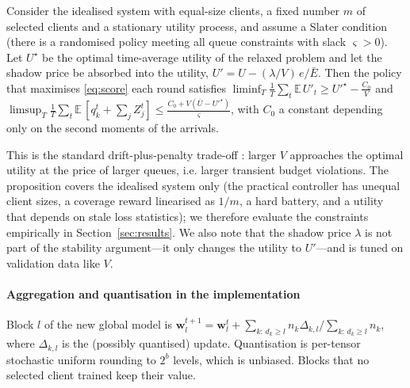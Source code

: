 \begin{proposition}\label{prop:lyap}
Consider the idealised system with equal-size clients, a fixed number $m$ of selected clients and a stationary utility process, and assume a Slater condition (there is a randomised policy meeting all queue constraints with slack $\varsigma>0$). Let $U^\star$ be the optimal time-average utility of the relaxed problem and let the shadow price be absorbed into the utility, $U'=U-(\lambda/V)\,e/\bar E$. Then the policy that maximises \eqref{eq:score} each round satisfies
$\liminf_T\frac1T\sum_t\mathbb E\,U'_t\ge U'^{\star}-\frac{C_0}{V}$ and
$\limsup_T\frac1T\sum_t\mathbb E\,[q_k^t+\sum_jZ_j^t]\le\frac{C_0+V(\bar U-U'^\star)}{\varsigma}$, with $C_0$ a constant depending only on the second moments of the arrivals.
\end{proposition}
\noindent This is the standard drift-plus-penalty trade-off \citep{neely2010stochastic}: larger $V$ approaches the optimal utility at the price of larger queues, i.e. larger transient budget violations. The proposition covers the idealised system only (the practical controller has unequal client sizes, a coverage reward linearised as $1/m$, a hard battery, and a utility that depends on stale loss statistics); we therefore evaluate the constraints empirically in Section~\ref{sec:results}. We also note that the shadow price $\lambda$ is not part of the stability argument---it only changes the utility to $U'$---and is tuned on validation data like $V$.

\paragraph{Aggregation and quantisation in the implementation}
Block $l$ of the new global model is $\mathbf w_l^{t+1}=\mathbf w_l^t+\sum_{k:\,d_k\ge l}n_k\Delta_{k,l}/\sum_{k:\,d_k\ge l}n_k$, where $\Delta_{k,l}$ is the (possibly quantised) update. Quantisation is per-tensor stochastic uniform rounding to $2^b$ levels, which is unbiased. Blocks that no selected client trained keep their value.
